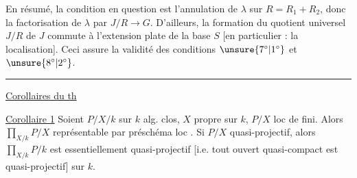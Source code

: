 En résumé, la condition en question est
l'annulation de $\lambda$ sur $R=R_1+R_2$,
donc la factorisation de $\lambda$ par $J/R\longrightarrow G$.
D'ailleurs, la formation du quotient universel
$J/R$ de $J$ commute à l'extension plate
de la base $S$ [en particulier : la localisation].
Ceci assure la validité des conditions
\uline{$\unsure{7^\circ|1^\circ}$} et \uline{$\unsure{8^\circ|2^\circ}$}.
\par\noindent\rule{\linewidth}{0.4pt}\par
\uline{Corollaires du th}

\uline{Corollaire 1} Soient $P/X/k$ sur $k$ alg. clos,
$X$ propre sur $k$, $P/X$ loc de   fini. Alors
$\displaystyle\prod_{X/k}P/X$ représentable par préschéma loc .
Si $P/X$ quasi-projectif, 
alors $\displaystyle\prod_{X/k}P/k$ est
essentiellement quasi-projectif [i.e. tout ouvert
quasi-compact est quasi-projectif] sur $k$.
